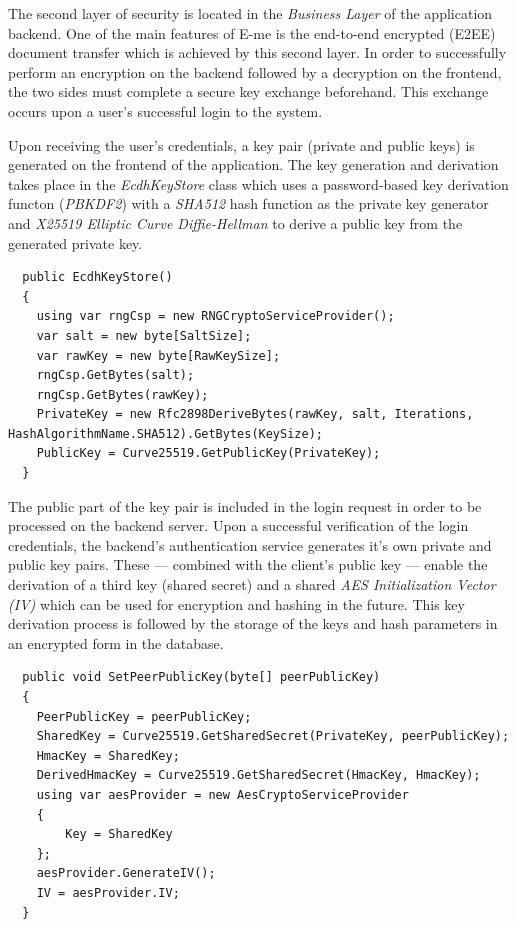 The second layer of security is located in the \emph{Business Layer} of the application backend.
One of the main features of E-me is the end-to-end encrypted (E2EE) document transfer which is achieved by this second layer.
In order to successfully perform an encryption on the backend followed by a decryption on the frontend, the two sides must complete a secure key exchange beforehand.
This exchange occurs upon a user's successful login to the system.

Upon receiving the user's credentials, a key pair (private and public keys) is generated on the frontend of the application.
The key generation and derivation takes place in the \emph{EcdhKeyStore} class which uses a password-based key derivation functon (\emph{PBKDF2}) with a \emph{SHA512} hash function
as the private key generator and \emph{X25519 Elliptic Curve Diffie-Hellman} to derive a public key from the generated private key.

\begin{lstlisting}
  public EcdhKeyStore()
  {
	using var rngCsp = new RNGCryptoServiceProvider();
	var salt = new byte[SaltSize];
	var rawKey = new byte[RawKeySize];
	rngCsp.GetBytes(salt);
	rngCsp.GetBytes(rawKey);
	PrivateKey = new Rfc2898DeriveBytes(rawKey, salt, Iterations, HashAlgorithmName.SHA512).GetBytes(KeySize);
	PublicKey = Curve25519.GetPublicKey(PrivateKey);  
  }
\end{lstlisting}

The public part of the key pair is included in the login request in order to be processed on the backend server.
Upon a successful verification of the login credentials, the backend's authentication service generates it's own private and public key pairs.
These --- combined with the client's public key --- enable the derivation of a third key (shared secret) and a shared \emph{AES Initialization Vector (IV)} which can be used for encryption and hashing in the future.
This key derivation process is followed by the storage of the keys and hash parameters in an encrypted form in the database.

\begin{lstlisting}
  public void SetPeerPublicKey(byte[] peerPublicKey)
  {
	PeerPublicKey = peerPublicKey;
	SharedKey = Curve25519.GetSharedSecret(PrivateKey, peerPublicKey);
	HmacKey = SharedKey;
	DerivedHmacKey = Curve25519.GetSharedSecret(HmacKey, HmacKey);
	using var aesProvider = new AesCryptoServiceProvider
	{
		Key = SharedKey
	};
	aesProvider.GenerateIV();
	IV = aesProvider.IV;
  }
\end{lstlisting}

